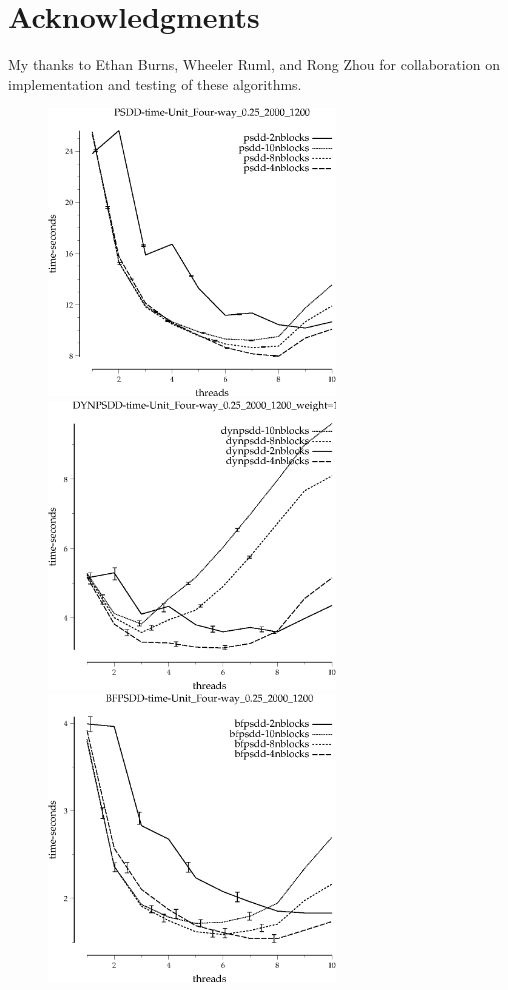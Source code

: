 \documentclass{article}
\begin{document}
\section{Acknowledgments}
My thanks to Ethan Burns, Wheeler Ruml, and Rong Zhou for collaboration on implementation and testing of these algorithms.




\begin{appendices}
\begin{figure}[h!]
\includegraphics[width=3in]{../graphs/grid_unit_four-way_0.25_2000_1200/PSDD-time-Unit_Four-way_0.25_2000_1200.eps}
\includegraphics[width=3in]{../graphs/grid_unit_four-way_0.25_2000_1200/DYNPSDD-time-Unit_Four-way_0.25_2000_1200_weight=1.5.eps}
\includegraphics[width=3in]{../graphs/grid_unit_four-way_0.25_2000_1200/BFPSDD-time-Unit_Four-way_0.25_2000_1200.eps}

\end{figure}
\end{appendices}
\end{document}
